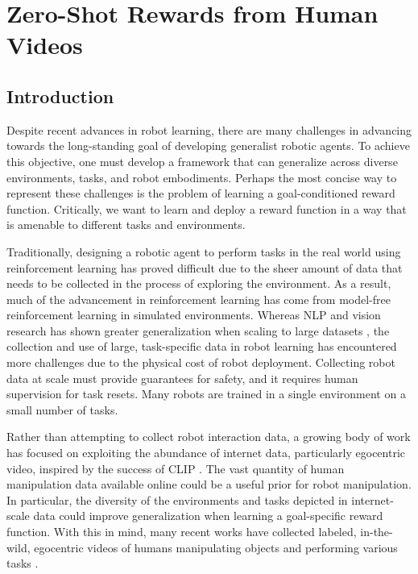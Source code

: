 \chapter{Zero-Shot Rewards from Human Videos}
\label{cha:reward}

\section{Introduction}
\label{sec:intro_reward}

Despite recent advances in robot learning, there are many challenges in advancing towards the long-standing goal of developing generalist robotic agents. To achieve this objective, one must develop a framework that can generalize across diverse environments, tasks, and robot embodiments. Perhaps the most concise way to represent these challenges is the problem of learning a goal-conditioned reward function. Critically, we want to learn and deploy a reward function in a way that is amenable to different tasks and environments.

Traditionally, designing a robotic agent to perform tasks in the real world using reinforcement learning has proved difficult due to the sheer amount of data that needs to be collected in the process of exploring the environment. As a result, much of the advancement in reinforcement learning has come from model-free reinforcement learning in simulated environments. Whereas NLP and vision research has shown greater generalization when scaling to large datasets \cite{gpt3}, the collection and use of large, task-specific data in robot learning has encountered more challenges due to the physical cost of robot deployment. Collecting robot data at scale must provide guarantees for safety, and it requires human supervision for task resets. Many robots are trained in a single environment on a small number of tasks. 

Rather than attempting to collect robot interaction data, a growing body of work has focused on exploiting the abundance of internet data, particularly egocentric video, inspired by the success of CLIP \cite{radford21clip}. The vast quantity of human manipulation data available online could be a useful prior for robot manipulation. In particular, the diversity of the environments and tasks depicted in internet-scale data could improve generalization when learning a goal-specific reward function. With this in mind, many recent works have collected labeled, in-the-wild, egocentric videos of humans manipulating objects and performing various tasks \cite{ego4d, smthsmth, epickitchens}.

